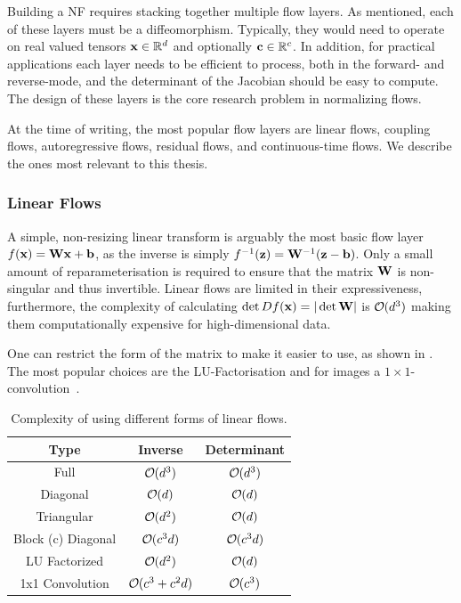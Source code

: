Building a NF requires stacking together multiple flow layers.
As mentioned, each of these layers must be a diffeomorphism.
Typically, they would need to operate on real valued tensors $\mathbf{x} \in \mathbb{R}^d$ and optionally $\mathbf{c} \in \mathbb{R}^c$.
In addition, for practical applications each layer needs to be efficient to process, both in the forward- and reverse-mode, and the determinant of the Jacobian should be easy to compute.
The design of these layers is the core research problem in normalizing flows.

At the time of writing, the most popular flow layers are linear flows, coupling flows, autoregressive flows, residual flows, and continuous-time flows.
We describe the ones most relevant to this thesis.

\subsubsection{Linear Flows}

A simple, non-resizing linear transform is arguably the most basic flow layer $f(\mathbf{x}) = \mathbf{W}\mathbf{x} + \mathbf{b}$, as the inverse is simply $f^{-1}(\mathbf{z}) = \mathbf{W}^{-1}(\mathbf{z} - \mathbf{b})$.
Only a small amount of reparameterisation is required to ensure that the matrix $\mathbf{W}$ is non-singular and thus invertible.
Linear flows are limited in their expressiveness, furthermore, the complexity of calculating $\det D f(\mathbf{x}) = |\det \mathbf{W}|$ is $\bigO(d^3)$ making them computationally expensive for high-dimensional data.

One can restrict the form of the matrix to make it easier to use, as shown in .
The most popular choices are the LU-Factorisation and for images a $1\times1$-convolution~\cite{GlowGenerativeFlow}.

\begin{table}[h!]
    \centering
    \caption{Complexity of using different forms of linear flows.}
    \label{tab:linear_flows}
    \begin{tabular}{ccc}
    \toprule
    \textbf{Type} & \textbf{Inverse} & \textbf{Determinant} \\
    \midrule
    Full & $\bigO(d^3)$ & $\bigO(d^3)$ \\
    Diagonal & $\bigO(d)$ & $\bigO(d)$ \\
    Triangular & $\bigO(d^2)$ & $\bigO(d)$ \\
    Block (c) Diagonal & $\bigO(c^3d)$ & $\bigO(c^3d)$ \\
    LU Factorized & $\bigO(d^2)$ & $\bigO(d)$ \\
    1x1 Convolution & $\bigO(c^3 + c^2d)$ & $\bigO(c^3)$ \\
    \bottomrule
    \end{tabular}
\end{table}

